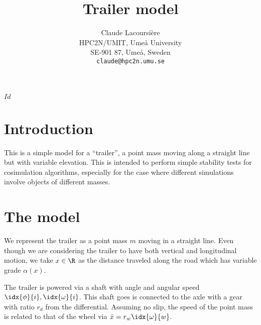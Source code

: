 \documentclass[10pt,notitlepage,abstracton]{scrartcl}
\title{Trailer model}
\author{Claude Lacoursi{\`{e}}re \\
  HPC2N/UMIT, Ume{\aa} University\\
  SE-901 87, Ume{\aa}, Sweden\\
  \texttt{claude@hpc2n.umu.se}
}
\theoremstyle{plain}
\theoremstyle{plain}
\theoremstyle{plain}
\begin{document}
\svnInfo $Id$
\maketitle{}
\svnId
\begin{abstract}

\end{abstract}

\section{Introduction}
\label{sec:introduction}

This is a simple model for a ``trailer'', a point mass moving along a
straight line but with variable elevation.   This is intended to perform
simple stability tests for cosimulation algorithms, especially for the case
where different simulations involve objects of different masses. 

\section{The model}
\label{sec:model}

We represent the trailer as a point mass $m$ moving in a straight line. Even
though we are considering the trailer to have both vertical and
longitudinal motion, we take $x\in\R$ as the distance traveled along the road
which has variable grade $\alpha(x)$.  


The trailer is powered via a shaft with angle and angular speed
$\idx{\phi}{i},\idx{\omega}{i}$.  This shaft goes is connected to the axle
with a gear with ratio $r_{d}$ from the differential.  Assuming no
slip, the speed of the point mass is related to that of the wheel via
$\dot{x} = r_{w}\idx{\omega}{w}$.
\end{document}
